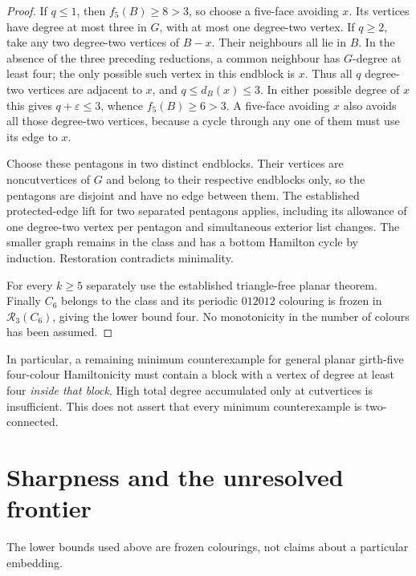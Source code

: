 \documentclass[11pt]{article}
\theoremstyle{remark}
\newcommand{\R}{\mathcal R}
\numberwithin{equation}{section}
\begin{document}
\begin{proof}
If $q\le1$, then $f_5(B)\ge8>3$, so choose a five-face avoiding
$x$. Its vertices have degree at most three in $G$, with at most
one degree-two vertex. If $q\ge2$, take any two degree-two vertices
of $B-x$. Their neighbours all lie in $B$. In the absence of the
three preceding reductions, a common neighbour has $G$-degree at
least four; the only possible such vertex in this endblock is $x$.
Thus all $q$ degree-two vertices are adjacent to $x$, and
$q\le d_B(x)\le3$. In either possible degree of $x$ this gives
$q+\varepsilon\le3$, whence $f_5(B)\ge6>3$. A five-face avoiding
$x$ also avoids all those degree-two vertices, because a cycle
through any one of them must use its edge to $x$.

Choose these pentagons in two distinct endblocks. Their vertices
are noncutvertices of $G$ and belong to their respective endblocks
only, so the pentagons are disjoint and have no edge between them.
The established protected-edge lift for two separated pentagons
applies, including its allowance of one degree-two vertex per
pentagon and simultaneous exterior list changes. The smaller graph
remains in the class and has a bottom Hamilton cycle by induction.
Restoration contradicts minimality.

For every $k\ge5$ separately use the established triangle-free
planar theorem. Finally $C_6$ belongs to the class and its periodic
$012012$ colouring is frozen in $\R_3(C_6)$, giving the lower bound
four. No monotonicity in the number of colours has been assumed.
\end{proof}
In particular, a remaining minimum counterexample for general
planar girth-five four-colour Hamiltonicity must contain a block
with a vertex of degree at least four \emph{inside that block}.
High total degree accumulated only at cutvertices is insufficient.
This does not assert that every minimum counterexample is two-connected.

\section{Sharpness and the unresolved frontier}
\label{sec:sharpness}

The lower bounds used above are frozen colourings, not claims about a particular embedding.
\end{document}
